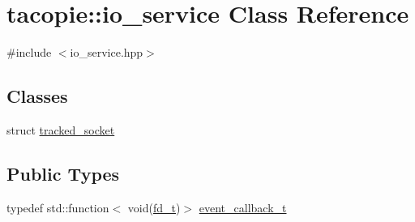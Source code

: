 \hypertarget{classtacopie_1_1io__service}{}\section{tacopie\+:\+:io\+\_\+service Class Reference}
\label{classtacopie_1_1io__service}


{\ttfamily \#include $<$io\+\_\+service.\+hpp$>$}

\subsection*{Classes}
\begin{DoxyCompactItemize}
\item 
struct \hyperlink{structtacopie_1_1io__service_1_1tracked__socket}{tracked\+\_\+socket}
\end{DoxyCompactItemize}
\subsection*{Public Types}
\begin{DoxyCompactItemize}
\item 
typedef std\+::function$<$ void(\hyperlink{namespacetacopie_acce7ad26b2d30156b1e6fa353f727026}{fd\+\_\+t})$>$ \hyperlink{classtacopie_1_1io__service_abb66850c32d9c724f4418d77bd04bcfd}{event\+\_\+callback\+\_\+t}
\end{DoxyCompactItemize}
